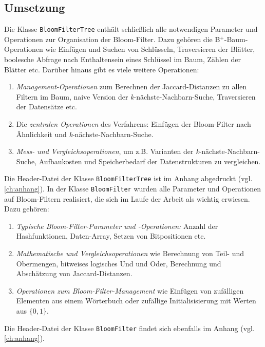 \subsection{Umsetzung}\label{sec:umsetzung}
Die Klasse \texttt{BloomFilterTree} enthält schließlich alle notwendigen Parameter und Operationen zur Organisation der Bloom-Filter. Dazu gehören die B$^+$-Baum-Operationen wie Einfügen und Suchen von Schlüsseln, Traversieren der Blätter, boolesche Abfrage nach Enthaltensein eines Schlüssel im Baum, Zählen der Blätter etc. Darüber hinaus gibt es viele weitere Operationen: 
\begin{enumerate}
\setlength{\itemsep}{20pt}
	\item \textit{Management-Operationen} zum Berechnen der Jaccard-Distanzen zu allen Filtern im Baum, naive Version der \textit{k}-nächste-Nachbarn-Suche, Traversieren der Datensätze etc.
	\item Die \textit{zentralen Operationen} des Verfahrens: Einfügen der Bloom-Filter nach Ähnlichkeit und \textit{k}-nächste-Nachbarn-Suche. 
	\item \textit{Mess- und Vergleichsoperationen}, um z.B. Varianten der \textit{k}-nächste-Nachbarn-Suche, Aufbaukosten und Speicherbedarf der Datenstrukturen zu vergleichen. 
\end{enumerate}
Die Header-Datei der Klasse \texttt{BloomFilterTree} ist im Anhang abgedruckt (vgl. \ref{ch:anhang}). In der Klasse \texttt{BloomFilter} wurden alle Parameter und Operationen auf Bloom-Filtern realisiert, die sich im Laufe der Arbeit als wichtig erwiesen. Dazu gehören: 
\begin{enumerate}
\setlength{\itemsep}{20pt}
	\item \textit{Typische Bloom-Filter-Parameter und -Operationen:} Anzahl der Hashfunktionen, Daten-Array, Setzen von Bitpositionen etc.
	\item \textit{Mathematische und Vergleichsoperationen} wie Berechnung von Teil- und Obermengen, bitweises logisches Und und Oder, Berechnung und Abschätzung von Jaccard-Distanzen.
	\item \textit{Operationen zum Bloom-Filter-Management} wie Einfügen von zufälligen Elementen aus einem Wörterbuch oder zufällige Initialisisierung mit Werten aus $\{0,1\}$.
\end{enumerate}
Die Header-Datei der Klasse \texttt{BloomFilter} findet sich ebenfalls im Anhang (vgl. \ref{ch:anhang}).
